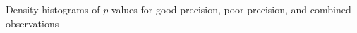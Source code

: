\label{fig:goodpoor-scatter} Density histograms of $p$ values for good-precision, poor-precision, and combined observations